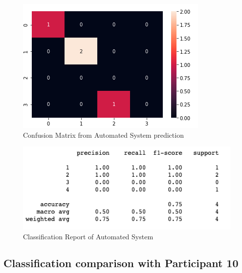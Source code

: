 \pagebreak

\begin{figure}[!htp]
    \includegraphics[width=\textwidth]{Images/a9.png}
    \caption{Confusion Matrix from Automated System prediction}
    \label{fig:f11}
\end{figure}

\begin{figure}[!htp]
    \includegraphics[width=\textwidth]{Images/a9r.png}
    \caption{Classification Report of Automated System}
    \label{fig:f11}
\end{figure}

\pagebreak
\subsection*{Classification comparison with Participant 10}

